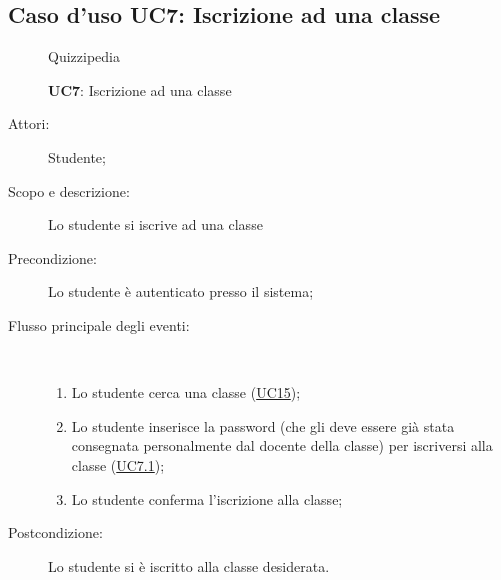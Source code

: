 \subsection{Caso d'uso UC7: Iscrizione ad una classe}
	\begin{figure}[H]
		\centering
		\begin{resizedtikzpicture}{\textwidth}
		\begin{umlsystem}[x=0, fill=lightgray!20]{Quizzipedia}
		\end{umlsystem}
		\end{resizedtikzpicture}
		\caption{\textbf{UC7}: Iscrizione ad una classe}
		\label{UC7}
	\end{figure}
\begin{description}
\item[Attori:] Studente;
\item[Scopo e descrizione:] Lo studente si iscrive ad una classe
      \item[Precondizione:] Lo studente è autenticato presso il sistema;

        \item[Flusso principale degli eventi:] \ 
 \begin{enumerate}
          \item Lo studente cerca una classe (\hyperlink{UC15}{UC15});
          \item Lo studente inserisce la password (che gli deve essere già stata consegnata personalmente dal docente della classe) per iscriversi alla classe (\hyperlink{UC7.1}{UC7.1});
          \item Lo studente conferma l'iscrizione alla classe;

      \end{enumerate}
    \item[Postcondizione:] Lo studente si è iscritto alla classe desiderata.
  \end{description}
\hypertarget{UC7.1}{}
